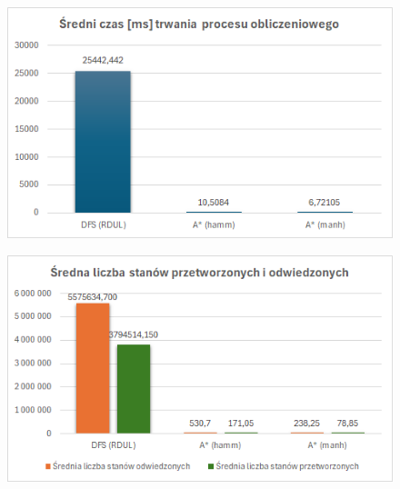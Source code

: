 \documentclass{classrep}
\begin{document}
\begin{figure}
    \centering
    \includegraphics[width=\textwidth,height=\textheight,keepaspectratio]{average-time-for-big-grapth}
    \caption{}
    \label{fig:6}
\end{figure}
\begin{figure}
    \centering
    \includegraphics[width=\textwidth,height=\textheight,keepaspectratio]{average-count-of-visited-for-big-graph}
    \caption{}
    \label{fig:7}
\end{figure}
\end{document}
